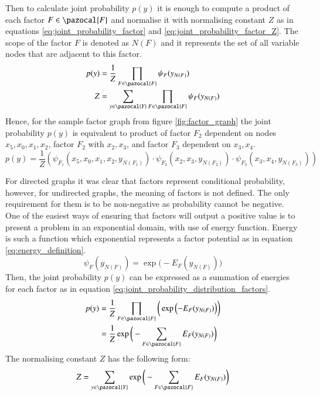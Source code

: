 Then to calculate joint probability $p(y)$ it is enough to compute a product of each factor $F \in \pazocal{F}$ and normalise it with normalising constant $Z$ as in equations \ref{eq:joint_probability_factor} and \ref{eq:joint_probability_factor_Z}. The scope of the factor $F$ is denoted as $N(F)$ and it represents the set of all  variable nodes that are adjacent to this factor.
\begin{align}
    \label{eq:joint_probability_factor}
    p(y) &= \frac{1}{Z}\prod_{F\in \pazocal{F}}\psi_{F}({y_{N(F)}}) \\
    \label{eq:joint_probability_factor_Z}
     Z &=\sum_{y\in \pazocal{Y}}\prod_{F\in \pazocal{F}}\psi_{F}({y_{N(F)}})
\end{align}
Hence, for the sample factor graph from figure \ref{fig:factor_graph} the joint probability $p(y)$ is equivalent to product of factor $F_2$ dependent on nodes $x_5, x_0, x_1, x_2$, factor $F_2$ with $x_2, x_3$, and factor $F_3$ dependent on $x_3, x_4$.
\begin{equation}
    \label{eq:joint_probability_example}
    p(y)=\frac{1}{Z}(\psi_{F_1}(x_5,x_0,x_1,x_2,y_{N(F_1)}) \cdot \psi_{F_2}(x_2,x_3,y_{N(F_2)}) \cdot \psi_{F_3}(x_3,x_4,y_{N(F_3)}))
\end{equation}

For directed graphs it was clear that factors represent conditional probability, however, for undirected graphs, the meaning of factors is not defined. The only requirement for them is to be non-negative as probability cannot be negative. One of the easiest ways of ensuring that factors will output a positive value is to present a problem in an exponential domain, with use of energy function. Energy is such a function which exponential represents a factor potential as in equation \ref{eq:energy_definition}.
\begin{equation}
    \label{eq:energy_definition}
    \psi_{F}(y_{N(F)}) = \exp{\Big(-E_F(y_{N(F)})\Big)}
\end{equation}
Then, the joint probability $p(y)$ can be expressed as a summation of energies for each factor as in equation \ref{eq:joint_probability_distribution_factors}.
\begin{equation}
\begin{aligned}
    \label{eq:joint_probability_distribution_factors}
     p(y) &=\frac{1}{Z}\prod_{F\in \pazocal{F}}\bigg(\exp\Big({-E_F(y_{N(F)})}\Big)\bigg) \\
     & =\frac{1}{Z}\exp\bigg(-\sum_{F \in \pazocal{F}}{E_F(y_{N(F)})}\bigg)
\end{aligned}
\end{equation}
The normalising constant $Z$ has the following form:
\begin{equation}
    Z=\sum_{y\in \pazocal{Y}}\exp\bigg(-\sum_{F \in \pazocal{F}}{E_F(y_{N(F)})\bigg)}
\end{equation}

